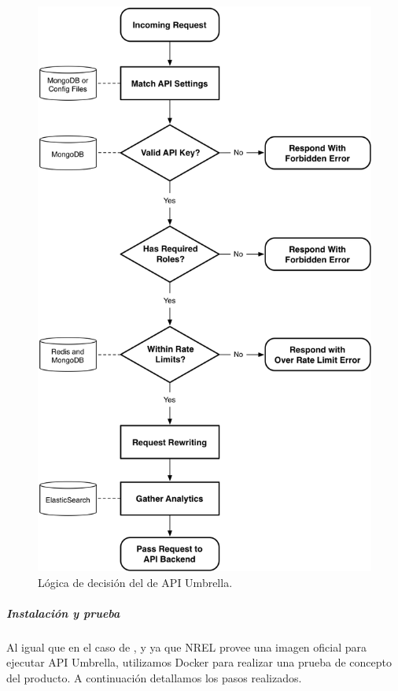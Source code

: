 \begin{figure}
  \includegraphics[width=\linewidth]{src/images/02-capitulo-2/tecnologias/api-umbrella/api-umbrella-gatekeeper.png}
  \caption{Lógica de decisión del  de API Umbrella.}
  \label{fig:api-umbrella-gatekeeper}
\end{figure}

\subparagraph{Instalación y prueba}

Al igual que en el caso de , y ya que NREL provee una imagen oficial para ejecutar API Umbrella, utilizamos Docker para realizar una prueba de concepto del producto. A continuación detallamos los pasos realizados.


